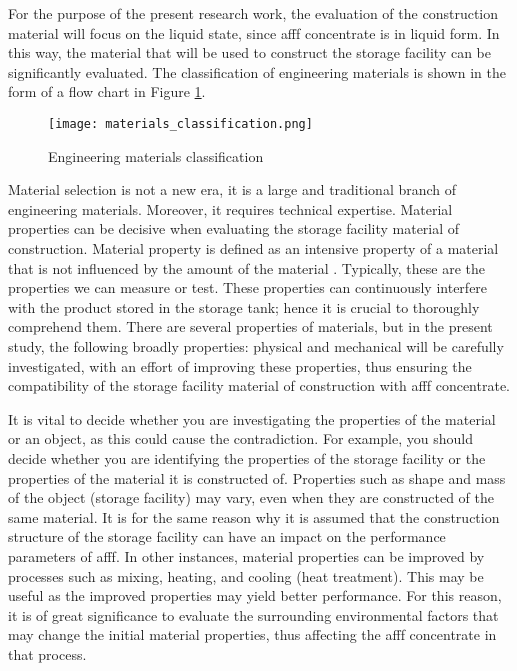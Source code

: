 For the purpose of the present research work, the evaluation of the construction material will focus on the liquid state, since \acrshort{afff} concentrate is in liquid form. In this way, the material that will be used to construct the storage facility can be significantly evaluated. The classification of engineering materials is shown in the form of a flow chart in Figure \ref{ch3:figure:materials}.

\begin{figure}[H]
    \centering
    \texttt{[image: materials\_classification.png]}
    \caption{Engineering materials classification \cite{timings2008fabrication}}
    \label{ch3:figure:materials}
\end{figure}

Material selection is not a new era, it is a large and traditional branch of engineering materials. Moreover, it requires technical expertise. Material properties can be decisive when evaluating the storage facility material of construction. Material property is defined as an intensive property of a material that is not influenced by the amount of the material \cite{mcarthur2004engineering}. Typically, these are the properties we can measure or test. These properties can continuously interfere with the product stored in the storage tank; hence it is crucial to thoroughly comprehend them. There are several properties of materials, but in the present study, the following broadly properties: physical and mechanical will be carefully investigated, with an effort of improving these properties, thus ensuring the compatibility of the storage facility material of construction with \acrshort{afff} concentrate.

It is vital to decide whether you are investigating the properties of the material or an object, as this could cause the contradiction. For example, you should decide whether you are identifying the properties of the storage facility or the properties of the material it is constructed of. Properties such as shape and mass of the object (storage facility) may vary, even when they are constructed of the same material. It is for the same reason why it is assumed that the construction structure of the storage facility can have an impact on the performance parameters of \acrshort{afff}.  In other instances, material properties can be improved by processes such as mixing, heating, and cooling (heat treatment). This may be useful as the improved properties may yield better performance. For this reason, it is of great significance to evaluate the surrounding environmental factors that may change the initial material properties, thus affecting the \acrshort{afff} concentrate in that process.

